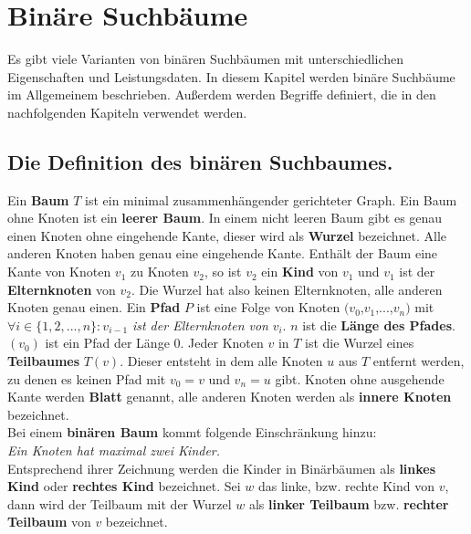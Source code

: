 \documentclass[a4paper,12pt]{article}
\begin{document}
\newpage
\section {Binäre Suchbäume}
Es gibt viele Varianten von binären Suchbäumen mit unterschiedlichen Eigenschaften und Leistungsdaten. In diesem Kapitel werden binäre Suchbäume im Allgemeinem beschrieben. Außerdem werden Begriffe definiert, die in den nachfolgenden Kapiteln verwendet werden. \\
\subsection {Die Definition des  binären Suchbaumes.}
Ein \textbf{Baum} $T$ ist ein minimal zusammenhängender gerichteter Graph. Ein Baum ohne Knoten ist ein \textbf{leerer Baum}. In einem nicht leeren Baum gibt es genau einen Knoten ohne eingehende Kante, dieser wird als \textbf{Wurzel}  bezeichnet. Alle anderen Knoten haben genau eine eingehende Kante.  Enthält der Baum eine Kante von Knoten $v_1$ zu Knoten $v_2$, so ist $v_2$ ein \textbf{Kind} von $v_1$ und $v_1$ ist der  \textbf{Elternknoten} von $v_2$. Die Wurzel hat also keinen Elternknoten, alle anderen Knoten genau einen.  Ein \textbf{Pfad} $P$ ist eine Folge von Knoten $(v_0$,$v_1$,...,$v_n)$ mit $\forall i \in \{ 1, 2,..., n \} \colon v_{i-1}$ \textit{ist der Elternknoten von} $v_i$. $n$ ist die \textbf{Länge des Pfades}. $\left(v_0\right)$ ist ein Pfad der Länge $0$. Jeder Knoten $v$ in $T$ ist die Wurzel eines \textbf{Teilbaumes} $T(v)$. Dieser entsteht in dem alle Knoten $u$ aus $T$ entfernt werden, zu denen es keinen Pfad mit  $v_0 = v$ und $v_n = u$ gibt. Knoten ohne ausgehende Kante werden \textbf{Blatt} genannt, alle anderen Knoten werden als \textbf{innere Knoten} bezeichnet.\\
Bei einem \textbf{binären Baum} kommt folgende Einschränkung hinzu:  \\
\textit{Ein Knoten hat maximal zwei Kinder.}\\ 
Entsprechend ihrer Zeichnung werden die Kinder in Binärbäumen als \textbf{linkes Kind} oder \textbf{rechtes Kind} bezeichnet. Sei $w$ das linke, bzw. rechte Kind von $v$, dann wird der Teilbaum mit der Wurzel $w$ als \textbf{linker Teilbaum} bzw. \textbf{rechter Teilbaum}  von $v$ bezeichnet.  
\end{document}
